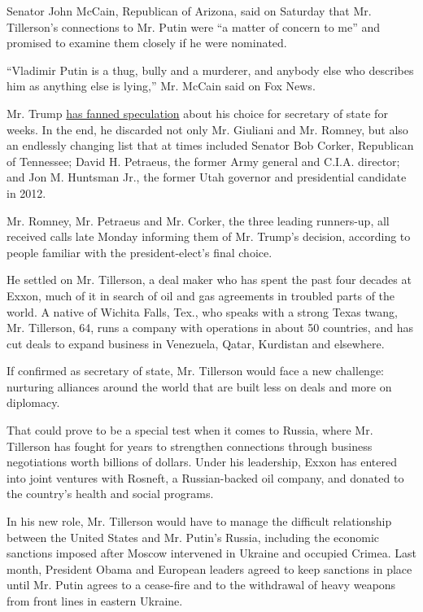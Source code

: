 Senator John McCain, Republican of Arizona, said on Saturday that Mr.
Tillerson's connections to Mr. Putin were ``a matter of concern to me''
and promised to examine them closely if he were nominated.

``Vladimir Putin is a thug, bully and a murderer, and anybody else who
describes him as anything else is lying,'' Mr. McCain said on Fox News.

Mr. Trump
\href{https://www.nytimes.com/2016/11/24/us/politics/donald-trump-mitt-romney-rudy-giuliani-state.html}{has
fanned speculation} about his choice for secretary of state for weeks.
In the end, he discarded not only Mr. Giuliani and Mr. Romney, but also
an endlessly changing list that at times included Senator Bob Corker,
Republican of Tennessee; David H. Petraeus, the former Army general and
C.I.A. director; and Jon M. Huntsman Jr., the former Utah governor and
presidential candidate in 2012.

Mr. Romney, Mr. Petraeus and Mr. Corker, the three leading runners-up,
all received calls late Monday informing them of Mr. Trump's decision,
according to people familiar with the president-elect's final choice.

He settled on Mr. Tillerson, a deal maker who has spent the past four
decades at Exxon, much of it in search of oil and gas agreements in
troubled parts of the world. A native of Wichita Falls, Tex., who speaks
with a strong Texas twang, Mr. Tillerson, 64, runs a company with
operations in about 50 countries, and has cut deals to expand business
in Venezuela, Qatar, Kurdistan and elsewhere.

If confirmed as secretary of state, Mr. Tillerson would face a new
challenge: nurturing alliances around the world that are built less on
deals and more on diplomacy.

That could prove to be a special test when it comes to Russia, where Mr.
Tillerson has fought for years to strengthen connections through
business negotiations worth billions of dollars. Under his leadership,
Exxon has entered into joint ventures with Rosneft, a Russian-backed oil
company, and donated to the country's health and social programs.

In his new role, Mr. Tillerson would have to manage the difficult
relationship between the United States and Mr. Putin's Russia, including
the economic sanctions imposed after Moscow intervened in Ukraine and
occupied Crimea. Last month, President Obama and European leaders agreed
to keep sanctions in place until Mr. Putin agrees to a cease-fire and to
the withdrawal of heavy weapons from front lines in eastern Ukraine.

